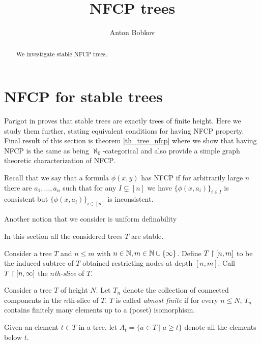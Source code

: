 \documentclass{amsart}
\begin{document}
\title{NFCP trees}
\author{Anton Bobkov}

\begin{abstract}
	We investigate stable NFCP trees. 
\end{abstract}

\maketitle

\section{NFCP for stable trees}
Parigot in \cite{parigot_trees} proves that stable trees are exactly trees of finite height. Here we study them further, stating equivalent conditions for having NFCP property. Final result of this section is theorem \ref{th_tree_nfcp} where we show that having NFCP is the same as being $\aleph_0$-categorical and also provide a simple graph theoretic characterization of NFCP.

Recall that we say that a formula $\phi(x, y)$ has NFCP if for arbitrarily large $n$ there are $a_1, \ldots, a_n$ such that for any $I \subsetneq [n]$ we have $\{\phi(x, a_i)\}_{i \in I}$ is consistent but $\{\phi(x, a_i)\}_{i \in [n]}$ is inconsistent.

Another notion that we consider is uniform definability 

In this section all the considered trees $T$ are stable.

\begin{Definition}
Consider a tree $T$ and $n \leq m$ with $n \in \mathbb{N}, m \in \mathbb{N} \cup \{\infty\}$. Define $T \upharpoonright [n,m]$ to be the induced subtree of $T$ obtained restricting nodes at depth $[n,m]$. Call $T \upharpoonright [n, \infty]$ the \emph{$n$th-slice} of $T$.
\end{Definition}

\begin{Definition}
	Consider a tree $T$ of height $N$. Let $T_n$ denote the collection of connected components in the $n$th-slice of $T$. $T$ is called \emph{almost finite} if for every $n \leq N$, $T_n$ contains finitely many elements up to a (poset) isomorphism.
\end{Definition}

\begin{Definition}
	Given an element $t \in T$ in a tree, let $A_t = \{a \in T \mid a \geq t\}$ denote all the elements below $t$.
\end{Definition}
\end{document}
